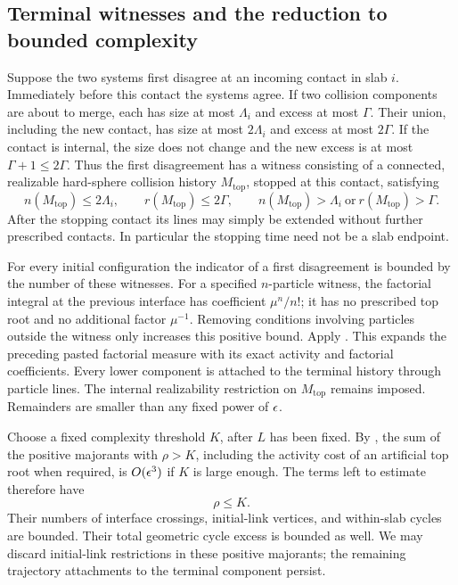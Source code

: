 \subsection{Terminal witnesses and the reduction to bounded complexity}

Suppose the two systems first disagree at an incoming contact in slab
\(i\).  Immediately before this contact the systems agree.  If two
collision components are about to merge, each has size at most
\(\Lambda_i\) and excess at most \(\Gamma\).  Their union, including the
new contact, has size at most \(2\Lambda_i\) and excess at most
\(2\Gamma\).  If the contact is internal, the size does not change and
the new excess is at most \(\Gamma+1\leq2\Gamma\).  Thus the first
disagreement has a witness consisting of a connected, realizable
hard-sphere collision history \(M_{\mathrm{top}}\), stopped at this
contact, satisfying
\begin{equation}\label{eq:cutoff-witness}
 n(M_{\mathrm{top}})\leq2\Lambda_i,\qquad
 r(M_{\mathrm{top}})\leq2\Gamma,\qquad
 n(M_{\mathrm{top}})>\Lambda_i
 \ \text{or}\ 
 r(M_{\mathrm{top}})>\Gamma .
\end{equation}
After the stopping contact its lines may simply be extended without
further prescribed contacts.  In particular the stopping time need not
be a slab endpoint.

For every initial configuration the indicator of a first disagreement
is bounded by the number of these witnesses.  For a specified
\(n\)-particle witness, the factorial integral at the previous interface
has coefficient \(\mu^n/n!\); it has no prescribed top root and no
additional factor \(\mu^{-1}\).  Removing conditions involving particles
outside the witness only increases this positive bound.
Apply .  This expands the preceding pasted
factorial measure with its exact activity and factorial coefficients.
Every lower component is attached to the terminal history through
particle lines.  The internal realizability restriction on
\(M_{\mathrm{top}}\) remains imposed.  Remainders are smaller than any
fixed power of \(\epsilon\).

Choose a fixed complexity threshold \(K\), after \(L\) has been fixed.
By \Cref{cor:terminal-witness,thm:dhm-package}, the sum of the positive
majorants with \(\rho>K\), including the activity cost of an artificial
top root when required, is \(O(\epsilon^3)\) if \(K\) is large enough.
The terms left to estimate therefore have
\begin{equation}\label{eq:cutoff-low-complexity}
 \rho\leq K .
\end{equation}
Their numbers of interface crossings, initial-link vertices, and
within-slab cycles are bounded.  Their total geometric cycle excess is
bounded as well.  We may discard initial-link restrictions in these
positive majorants; the remaining trajectory attachments to the
terminal component persist.

